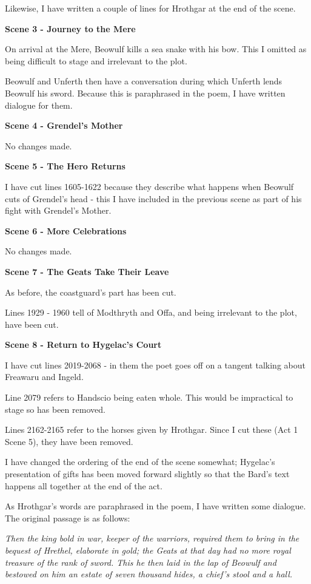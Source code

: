 \documentclass[a4paper]{article}
\begin{document}
{Likewise, I have written a couple of lines for Hrothgar at the
end of the scene.

\centerline{\textbf{Scene 3 - Journey to the Mere}}

On arrival at the Mere, Beowulf kills a sea snake with his bow. 
This I omitted as being difficult to stage and irrelevant to the plot.

Beowulf and Unferth then have a conversation during which Unferth lends
Beowulf his sword. Because this is paraphrased in the poem, I have written
dialogue for them. 

\centerline{\textbf{Scene 4 - Grendel's Mother}}

No changes made.

\centerline{\textbf{Scene 5 - The Hero Returns}}

I have cut lines 1605-1622 because they describe what happens when
Beowulf cuts of Grendel's head - this I have included in the previous scene 
as part of his fight with Grendel's Mother.

\centerline{\textbf{Scene 6 - More Celebrations}}

No changes made.

\centerline{\textbf{Scene 7 - The Geats Take Their Leave}}

As before, the coastguard's part has been cut.

Lines 1929 - 1960 tell of Modthryth and Offa, and
being irrelevant to the plot, have been cut. 

\centerline{\textbf{Scene 8 - Return to Hygelac's Court}}

I have cut lines 2019-2068 - in them the poet goes off on 
a tangent talking about Freawaru and Ingeld.

Line 2079 refers to Handscio being eaten whole. This would be
impractical to stage so has been removed.

Lines 2162-2165 refer to the horses given by Hrothgar. Since 
I cut these (Act 1 Scene 5), they have been removed.

I have changed the ordering of the end of the scene somewhat;
Hygelac's presentation of gifts has been moved forward slightly
so that the Bard's text happens all together at the end of the act.

As Hrothgar's words are paraphrased in the poem, I have written some dialogue.
The original passage is as follows:

\textit{ Then the king bold in war, keeper of the warriors,
required them to bring in the bequest of Hrethel,
elaborate in gold; the Geats at that day
had no more royal treasure of the rank of sword.
This he then laid in the lap of Beowulf
and bestowed on him an estate of seven thousand hides,
a chief’s stool and a hall.}

}
\end{document}
